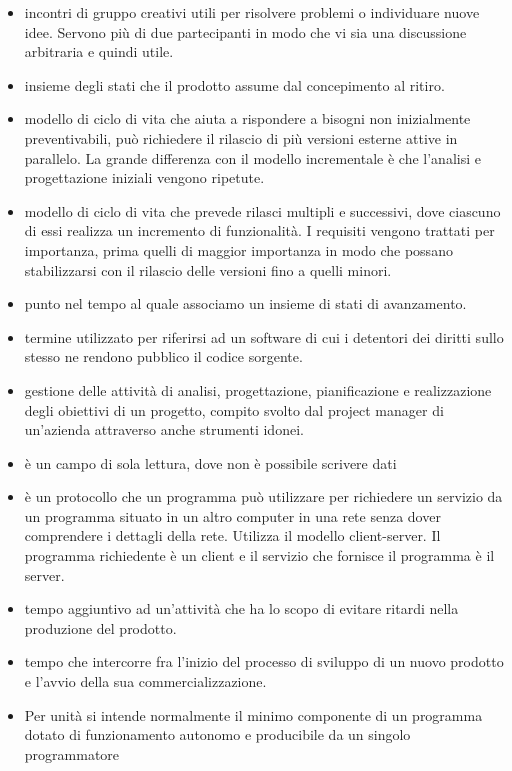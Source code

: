 
\begin{itemize} 

	\item {} incontri di gruppo creativi utili per risolvere problemi o individuare nuove idee. Servono più di due partecipanti in modo che vi sia una discussione arbitraria e quindi utile.
	\item {} insieme degli stati che il prodotto assume dal concepimento al ritiro.
	\item {} modello di ciclo di vita che aiuta a rispondere a bisogni non inizialmente preventivabili, può richiedere il rilascio di più versioni esterne attive in parallelo. La grande differenza con il modello incrementale è che l'analisi e progettazione iniziali vengono ripetute.
	\item {} modello di ciclo di vita che prevede rilasci multipli e successivi, dove ciascuno di essi realizza un incremento di funzionalità. I requisiti vengono trattati per importanza, prima quelli di maggior importanza in modo che possano stabilizzarsi con il rilascio delle versioni fino a quelli minori.
	\item {} punto nel tempo al quale associamo un insieme di stati di avanzamento.
	\item {} termine utilizzato per riferirsi ad un software di cui i detentori dei diritti sullo stesso ne rendono pubblico il codice sorgente.
	\item {} gestione delle attività di analisi, progettazione, pianificazione e realizzazione degli obiettivi di un progetto, compito svolto dal project manager di un'azienda attraverso anche strumenti idonei.
	\item {} è un campo di sola lettura, dove non è possibile scrivere dati
	\item {} è un  protocollo  che un programma può utilizzare per richiedere un servizio da un programma situato in un altro computer in una rete senza dover comprendere i dettagli della rete. Utilizza il   modello client-server. Il programma richiedente è un client e il servizio che fornisce il programma è il server.
	\item {} tempo aggiuntivo ad un'attività che ha lo scopo di evitare ritardi nella produzione del prodotto.
	\item {} tempo che intercorre fra l’inizio del processo di sviluppo di un nuovo prodotto e l’avvio della sua commercializzazione.
	\item {} Per unità si intende normalmente il minimo componente di un programma dotato di funzionamento autonomo e producibile da un singolo programmatore

\end{itemize} 
